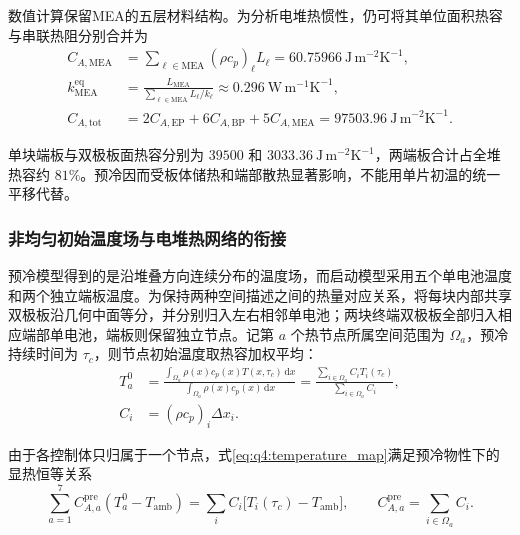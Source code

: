 \documentclass[bwprint]{gmcmthesis}
\numberwithin{equation}{section}
\numberwithin{figure}{section}
\begin{document}
数值计算保留MEA的五层材料结构。为分析电堆热惯性，仍可将其单位面积热容与串联热阻分别合并为
\begin{equation}
\begin{aligned}
C_{A,\mathrm{MEA}}&=\sum_{\ell\in\mathrm{MEA}}(\rho c_p)_\ell L_\ell
=60.75966\ \mathrm{J\,m^{-2}K^{-1}},\\
k_{\mathrm{MEA}}^{\mathrm{eq}}&=\frac{L_{\mathrm{MEA}}}{\displaystyle\sum_{\ell\in\mathrm{MEA}}L_\ell/k_\ell}
\approx0.296\ \mathrm{W\,m^{-1}K^{-1}},\\
C_{A,\mathrm{tot}}&=2C_{A,\mathrm{EP}}+6C_{A,\mathrm{BP}}+5C_{A,\mathrm{MEA}}
=97503.96\ \mathrm{J\,m^{-2}K^{-1}}.
\end{aligned}
\label{eq:q4:precool_capacity}
\end{equation}

单块端板与双极板面热容分别为 $39500$ 和 $3033.36\ \mathrm{J\,m^{-2}K^{-1}}$，两端板合计占全堆热容约 $81\%$。预冷因而受板体储热和端部散热显著影响，不能用单片初温的统一平移代替。

\subsubsection{非均匀初始温度场与电堆热网络的衔接}

预冷模型得到的是沿堆叠方向连续分布的温度场，而启动模型采用五个单电池温度和两个独立端板温度。为保持两种空间描述之间的热量对应关系，将每块内部共享双极板沿几何中面等分，并分别归入左右相邻单电池；两块终端双极板全部归入相应端部单电池，端板则保留独立节点。记第 $a$ 个热节点所属空间范围为 $\Omega_a$，预冷持续时间为 $\tau_c$，则节点初始温度取热容加权平均：
\begin{equation}
\begin{aligned}
T_a^0&=\frac{\displaystyle\int_{\Omega_a}\rho(x)c_p(x)T(x,\tau_c)\,\mathrm dx}
{\displaystyle\int_{\Omega_a}\rho(x)c_p(x)\,\mathrm dx}
=\frac{\displaystyle\sum_{i\in\Omega_a}C_iT_i(\tau_c)}
{\displaystyle\sum_{i\in\Omega_a}C_i},\\
C_i&=(\rho c_p)_i\Delta x_i.
\end{aligned}
\label{eq:q4:temperature_map}
\end{equation}

由于各控制体只归属于一个节点，式\eqref{eq:q4:temperature_map}满足预冷物性下的显热恒等关系
\begin{equation}
\sum_{a=1}^{7}C_{A,a}^{\mathrm{pre}}(T_a^0-T_{\mathrm{amb}})
=\sum_iC_i\big[T_i(\tau_c)-T_{\mathrm{amb}}\big],\qquad
C_{A,a}^{\mathrm{pre}}=\sum_{i\in\Omega_a}C_i.
\label{eq:q4:map_energy}
\end{equation}
\end{document}
